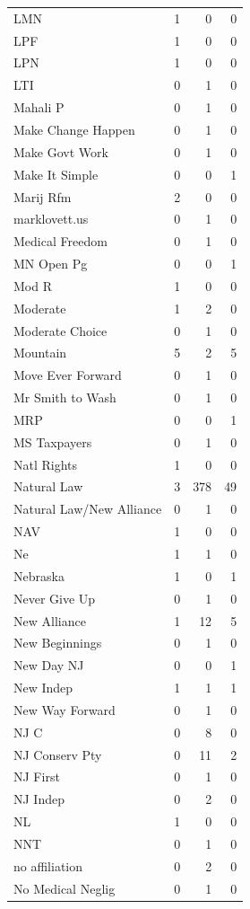 \begin{supertabular}{lrrr}
LMN & 1 & 0 & 0\\
LPF & 1 & 0 & 0\\
LPN & 1 & 0 & 0\\
LTI & 0 & 1 & 0\\
Mahali P & 0 & 1 & 0\\
Make Change Happen & 0 & 1 & 0\\
Make Govt Work & 0 & 1 & 0\\
Make It Simple & 0 & 0 & 1\\
Marij Rfm & 2 & 0 & 0\\
marklovett.us & 0 & 1 & 0\\
Medical Freedom & 0 & 1 & 0\\
MN Open Pg & 0 & 0 & 1\\
Mod R & 1 & 0 & 0\\
Moderate & 1 & 2 & 0\\
Moderate Choice & 0 & 1 & 0\\
Mountain & 5 & 2 & 5\\
Move Ever Forward & 0 & 1 & 0\\
Mr Smith to Wash & 0 & 1 & 0\\
MRP & 0 & 0 & 1\\
MS Taxpayers & 0 & 1 & 0\\
Natl Rights & 1 & 0 & 0\\
Natural Law & 3 & 378 & 49\\
Natural Law/New Alliance & 0 & 1 & 0\\
NAV & 1 & 0 & 0\\
Ne & 1 & 1 & 0\\
Nebraska & 1 & 0 & 1\\
Never Give Up & 0 & 1 & 0\\
New Alliance & 1 & 12 & 5\\
New Beginnings & 0 & 1 & 0\\
New Day NJ & 0 & 0 & 1\\
New Indep & 1 & 1 & 1\\
New Way Forward & 0 & 1 & 0\\
NJ C & 0 & 8 & 0\\
NJ Conserv Pty & 0 & 11 & 2\\
NJ First & 0 & 1 & 0\\
NJ Indep & 0 & 2 & 0\\
NL & 1 & 0 & 0\\
NNT & 0 & 1 & 0\\
no  affiliation & 0 & 2 & 0\\
No Medical Neglig & 0 & 1 & 0\\

\end{supertabular}
